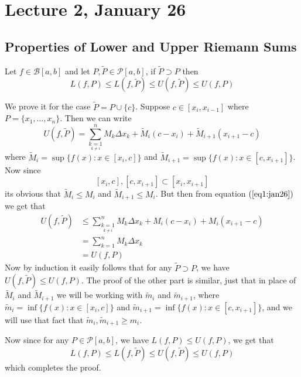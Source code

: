 \chapter*{Lecture 2, January 26}
\setcounter{chapter}{2}
\setcounter{section}{0}

\section{Properties of Lower and Upper Riemann Sums}

\begin{props}\label{prop1:jan26}
    Let $f \in \mathcal{B}[a,b]$ and let $P, \tilde{P} \in \mathcal{P}[a,b]$, if $\tilde{P} \supset P$ then \[ L(f,P) \leq L(f,\tilde{P}) \leq U(f,\tilde{P}) \leq U(f,P)\]
\end{props}
\begin{prf}
    We prove it for the case $\tilde{P} = P \cup \{c\}$. Suppose $c \in [x_i, x_{i-1}]$ where $P = \{x_1,\dots,x_n\}$. Then we can write 
    \begin{equation}\label{eq1:jan26}
        U(f,\tilde{P}) = \sum_{\underset{k \neq i}{k=1}}^n M_k \Delta x_k + \tilde{M}_i(c-x_i)+\tilde{M}_{i+1}(x_{i+1}-c) 
    \end{equation}
    where $\tilde{M}_i = \sup \{f(x) : x\in [x_i,c]\}$ and $\tilde{M}_{i+1} = \sup \{f(x) : x \in [c,x_{i+1}]\}$. Now since \[[x_i,c], [c,x_{i+1}] \subset [x_i,x_{i+1}]\] its obvious that $\tilde{M}_i \leq M_i$ and $\tilde{M}_{i+1} \leq M_i$. But then from equation $(\ref{eq1:jan26})$ we get that 
    \begin{align*}
        U(f,\tilde{P}) &\leq \sum_{\underset{k \neq i}{k=1}}^n M_k \Delta x_k + M_i(c-x_i)+M_i(x_{i+1}-c) \\ &= \sum_{k=1}^n M_k \Delta x_k \\ &= U(f,P) 
    \end{align*}
    Now by induction it easily follows that for any $\tilde{P} \supset P$, we have $U(f,\tilde{P}) \leq U(f,P)$. The proof of the other part is similar, just that in place of $\tilde{M}_i$ and $\tilde{M}_{i+1}$ we will be working with $\tilde{m}_i$ and $\tilde{m}_{i+1}$, where $\tilde{m}_i = \inf \{f(x) : x \in [x_i,c]\}$ and $\tilde{m}_{i+1} = \inf \{ f(x) : x \in [c,x_{i+1}] \}$, and we will use that fact that $\tilde{m}_i, \tilde{m}_{i+1} \geq m_i$. 

    Now since for any $ P \in \mathcal{P}[a,b]$, we have $L(f,P) \leq U(f,P)$, we get that 
    \[ L(f,P) \leq L(f,\tilde{P}) \leq U(f,\tilde{P}) \leq U(f,P) \]
    which completes the proof.
\end{prf}

